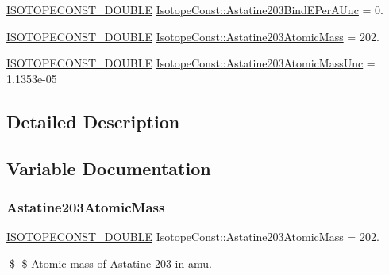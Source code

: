 \begin{DoxyCompactItemize}
\mbox{\hyperlink{group___isotope_const-_macros_ga8f45a7272ce02c0b4c65c44636ed719a}{I\+S\+O\+T\+O\+P\+E\+C\+O\+N\+S\+T\+\_\+\+D\+O\+U\+B\+LE}} \mbox{\hyperlink{group___isotope_const-_astatine-_at203_ga1da4be166429856d528a20918f473ee7}{Isotope\+Const\+::\+Astatine203\+Bind\+E\+Per\+A\+Unc}} = 0.
\item 
\mbox{\hyperlink{group___isotope_const-_macros_ga8f45a7272ce02c0b4c65c44636ed719a}{I\+S\+O\+T\+O\+P\+E\+C\+O\+N\+S\+T\+\_\+\+D\+O\+U\+B\+LE}} \mbox{\hyperlink{group___isotope_const-_astatine-_at203_ga99a2fb764793e1162fffbfc87212f5b8}{Isotope\+Const\+::\+Astatine203\+Atomic\+Mass}} = 202.
\item 
\mbox{\hyperlink{group___isotope_const-_macros_ga8f45a7272ce02c0b4c65c44636ed719a}{I\+S\+O\+T\+O\+P\+E\+C\+O\+N\+S\+T\+\_\+\+D\+O\+U\+B\+LE}} \mbox{\hyperlink{group___isotope_const-_astatine-_at203_ga500154bc648be3a0dc5ec24bb32aa205}{Isotope\+Const\+::\+Astatine203\+Atomic\+Mass\+Unc}} = 1.\+1353e-\/05
\end{DoxyCompactItemize}


\subsection{Detailed Description}


\subsection{Variable Documentation}
\mbox{\label{group___isotope_const-_astatine-_at203_ga99a2fb764793e1162fffbfc87212f5b8}} 
\subsubsection{\texorpdfstring{Astatine203\+Atomic\+Mass}{Astatine203AtomicMass}}
{\footnotesize\ttfamily \mbox{\hyperlink{group___isotope_const-_macros_ga8f45a7272ce02c0b4c65c44636ed719a}{I\+S\+O\+T\+O\+P\+E\+C\+O\+N\+S\+T\+\_\+\+D\+O\+U\+B\+LE}} Isotope\+Const\+::\+Astatine203\+Atomic\+Mass = 202.}

\$ \$ Atomic mass of Astatine-\/203 in amu. \mbox{\label{group___isotope_const-_astatine-_at203_ga500154bc648be3a0dc5ec24bb32aa205}} 
